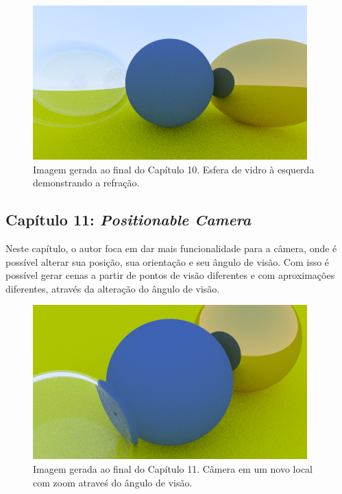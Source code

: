 \documentclass[journal]{IEEEtran}
\begin{document}
\begin{figure}[ht]
  \centering
  \includegraphics[width=\linewidth]{media/img-1.16-glass-hollow.png}
  \caption{Imagem gerada ao final do Capítulo 10. Esfera de vidro à esquerda demonstrando a refração.}
  \label{img_dieletric}
\end{figure}

\subsection*{Capítulo 11: \emph{Positionable Camera}}
Neste capítulo, o autor foca em dar mais funcionalidade para a câmera, onde é possível alterar sua posição,
sua orientação e seu ângulo de visão. Com isso é possível gerar cenas a partir de pontos de visão diferentes
e com aproximações diferentes, através da alteração do ângulo de visão.

\begin{figure}[ht]
  \centering
  \includegraphics[width=\linewidth]{media/img-1.19-view-zoom.png}
  \caption{Imagem gerada ao final do Capítulo 11. Câmera em um novo local com zoom atraveś do
  ângulo de visão.}
  \label{img_cam}
\end{figure}
\end{document}
